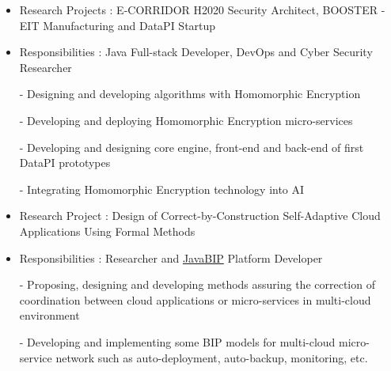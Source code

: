 \documentclass[10pt,a4paper,ragged2e]{altacv}
\begin{document}
	\begin{itemize}
		\item Research Projects : E-CORRIDOR H2020 Security Architect, BOOSTER - EIT Manufacturing and DataPI Startup
		
		\item Responsibilities : Java Full-stack Developer, DevOps and Cyber Security Researcher
		
		- Designing and developing algorithms with Homomorphic Encryption
		
		- Developing and deploying Homomorphic Encryption micro-services 
		
		- Developing and designing core engine, front-end and back-end of first DataPI prototypes
		
		- Integrating Homomorphic Encryption technology into AI 
		
	\end{itemize}
	
	
	
	\divider
	
	
	
	\begin{itemize}
		\item Research Project : Design of Correct-by-Construction Self-Adaptive Cloud Applications Using Formal Methods
		
		\item Responsibilities : Researcher 
		and \href{https://github.com/sbliudze/javabip-core}{JavaBIP} Platform Developer
		
		- Proposing, designing and developing methods assuring the correction of coordination between cloud applications or micro-services in multi-cloud environment
		
		- Developing and implementing some BIP models for multi-cloud micro-service network such as auto-deployment, auto-backup, monitoring, etc.
		
		
	\end{itemize}
\end{document}
